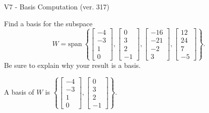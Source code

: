 \begin{exercise}
  \begin{exerciseTitle}V7 - Basis Computation (ver. 317)\end{exerciseTitle}
  \begin{exerciseStatement}
    Find a basis for the subspace 
\[W=\mathrm{span}\ \left\{\left[\begin{array}{r}
-4 \\
-3 \\
1 \\
0
\end{array}\right] , \left[\begin{array}{r}
0 \\
3 \\
2 \\
-1
\end{array}\right] , \left[\begin{array}{r}
-16 \\
-21 \\
-2 \\
3
\end{array}\right] , \left[\begin{array}{r}
12 \\
24 \\
7 \\
-5
\end{array}\right]\right\}.\]
 Be sure to explain why your result is a basis.


  \end{exerciseStatement}
  \begin{exerciseAnswer}
   A basis of \(W\) is  \(\left\{\left[\begin{array}{r}
-4 \\
-3 \\
1 \\
0
\end{array}\right] , \left[\begin{array}{r}
0 \\
3 \\
2 \\
-1
\end{array}\right]\right\}\).
  


  \end{exerciseAnswer}
\end{exercise}